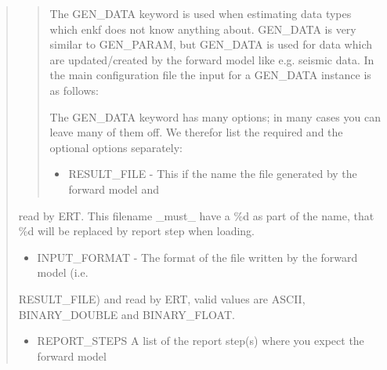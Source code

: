 \documentclass[letterpaper,10pt,english]{sphinxmanual}
\begin{document}
\begin{sphinxShadowBox}
\begin{quote}
\begin{quote}

The GEN\_DATA keyword is used when estimating data types which enkf does not
know anything about. GEN\_DATA is very similar to GEN\_PARAM, but GEN\_DATA is
used for data which are updated/created by the forward model like e.g. seismic
data. In the main configuration file the input for a GEN\_DATA instance is as
follows:

%
\begin{sphinxVerbatim}[commandchars=\\\{\}]
              
\end{sphinxVerbatim}

The GEN\_DATA keyword has many options; in many cases you can leave many of
them off. We therefor list the required and the optional options separately:

\begin{itemize}
\item {} 
RESULT\_FILE - This if the name the file generated by the forward model and

\end{itemize}
\end{quote}

read by ERT. This filename \_must\_ have a \%d as part of the name, that \%d
will be replaced by report step when loading.
\begin{itemize}
\item {} 
INPUT\_FORMAT - The format of the file written by the forward model (i.e.

\end{itemize}

RESULT\_FILE) and read by ERT, valid values are ASCII, BINARY\_DOUBLE and
BINARY\_FLOAT.
\begin{itemize}
\item {} 
REPORT\_STEPS A list of the report step(s) where you expect the forward model


\end{itemize}
\end{quote}
\end{sphinxShadowBox}
\end{document}
